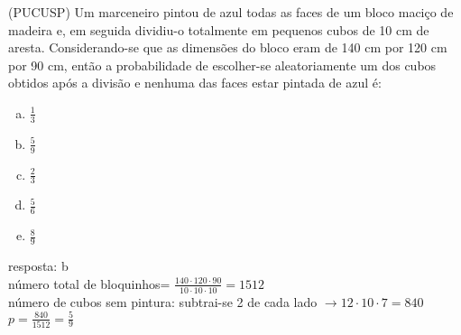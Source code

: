 \begin{ex}
 (PUCUSP) Um marceneiro pintou de azul todas as faces de um bloco maciço de madeira e, em seguida dividiu-o totalmente em pequenos cubos de 10 cm de aresta. Considerando-se que as dimensões do bloco eram de 140 cm por 120 cm por 90 cm, então a probabilidade de escolher-se aleatoriamente um dos cubos obtidos após a divisão e nenhuma das faces estar pintada de azul é:
    \begin{enumerate}[(a)]
    \item $\frac{1}{3}$
    \item $\frac{5}{9}$
    \item $\frac{2}{3}$
    \item $\frac{5}{6}$
    \item $\frac{8}{9}$
    \end{enumerate}
      \begin{sol}
        resposta: b \\
        número total de bloquinhos=  $\frac{140\cdot120\cdot90}{10\cdot10\cdot10}=1512$ \\
        número de cubos sem pintura: subtrai-se 2 de cada lado $\rightarrow 12\cdot10\cdot7=840$  \\
        $p=\frac{840}{1512}=\frac{5}{9}$
        
      \end{sol}
\end{ex}